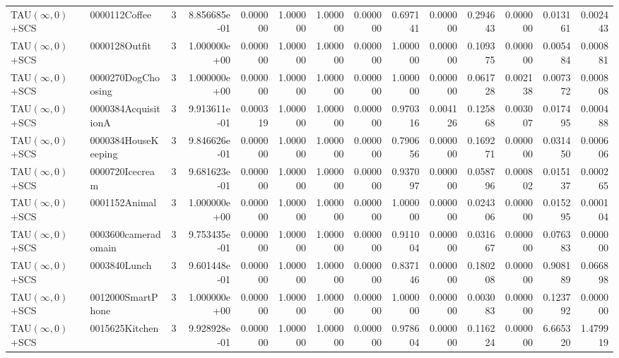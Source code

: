 \begin{tabular}{llrr|r|rr|rr|rr|rrr}
     TAU$(\infty, 0)$+SCS &          0000112Coffee &       3 & 8.856685e-01 & 0.000000 & 1.000000 &      1.000000 & 0.000000 &      0.697141 & 0.000000 &      0.294643 &    0.000000 &     0.013161 &    0.002443 \\
     TAU$(\infty, 0)$+SCS &          0000128Outfit &       3 & 1.000000e+00 & 0.000000 & 1.000000 &      1.000000 & 0.000000 &      1.000000 & 0.000000 &      0.109375 &    0.000000 &     0.005484 &    0.000881 \\
     TAU$(\infty, 0)$+SCS &     0000270DogChoosing &       3 & 1.000000e+00 & 0.000000 & 1.000000 &      1.000000 & 0.000000 &      1.000000 & 0.000000 &      0.061728 &    0.002138 &     0.007372 &    0.000808 \\
     TAU$(\infty, 0)$+SCS &    0000384AcquisitionA &       3 & 9.913611e-01 & 0.000319 & 1.000000 &      1.000000 & 0.000000 &      0.970316 & 0.004126 &      0.125868 &    0.003007 &     0.017495 &    0.000488 \\
     TAU$(\infty, 0)$+SCS &    0000384HouseKeeping &       3 & 9.846626e-01 & 0.000000 & 1.000000 &      1.000000 & 0.000000 &      0.790656 & 0.000000 &      0.169271 &    0.000000 &     0.031450 &    0.000606 \\
     TAU$(\infty, 0)$+SCS &        0000720Icecream &       3 & 9.681623e-01 & 0.000000 & 1.000000 &      1.000000 & 0.000000 &      0.937097 & 0.000000 &      0.058796 &    0.000802 &     0.015137 &    0.000265 \\
     TAU$(\infty, 0)$+SCS &          0001152Animal &       3 & 1.000000e+00 & 0.000000 & 1.000000 &      1.000000 & 0.000000 &      1.000000 & 0.000000 &      0.024306 &    0.000000 &     0.015295 &    0.000104 \\
     TAU$(\infty, 0)$+SCS &    0003600cameradomain &       3 & 9.753435e-01 & 0.000000 & 1.000000 &      1.000000 & 0.000000 &      0.911004 & 0.000000 &      0.031667 &    0.000000 &     0.076383 &    0.000000 \\
     TAU$(\infty, 0)$+SCS &           0003840Lunch &       3 & 9.601448e-01 & 0.000000 & 1.000000 &      1.000000 & 0.000000 &      0.837146 & 0.000000 &      0.180208 &    0.000000 &     0.908189 &    0.066898 \\
     TAU$(\infty, 0)$+SCS &      0012000SmartPhone &       3 & 1.000000e+00 & 0.000000 & 1.000000 &      1.000000 & 0.000000 &      1.000000 & 0.000000 &      0.003083 &    0.000000 &     0.123792 &    0.000000 \\
     TAU$(\infty, 0)$+SCS &         0015625Kitchen &       3 & 9.928928e-01 & 0.000000 & 1.000000 &      1.000000 & 0.000000 &      0.978604 & 0.000000 &      0.116224 &    0.000000 &     6.665320 &    1.479919 \\

\end{tabular}
